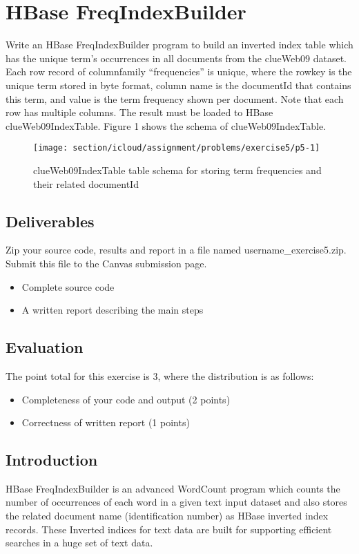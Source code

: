\section*{HBase FreqIndexBuilder}


Write an HBase FreqIndexBuilder program to build an inverted index table which
has the unique term's occurrences in all documents from the clueWeb09 dataset.
Each row record of columnfamily ``frequencies'' is unique, where the rowkey is
the unique term stored in byte format, column name is the documentId that
contains this term, and value is the term frequency shown per document. Note
that each row has multiple columns. The result must be loaded to HBase
clueWeb09IndexTable. Figure 1 shows the schema of clueWeb09IndexTable.

\begin{figure}[!htbp]
\texttt{[image: section/icloud/assignment/problems/exercise5/p5-1]}
\centering
\caption{clueWeb09IndexTable table schema for storing term frequencies and their related documentId}
\end{figure}

\subsection*{Deliverables}
Zip your source code, results and report in a file named
username\_exercise5.zip. Submit this file to the Canvas submission page.

\begin{itemize}
\item Complete source code
\item A written report describing the main steps
\end{itemize}

\subsection*{Evaluation}
The point total for this exercise is 3, where the distribution is as follows:
\begin{itemize}
\item Completeness of your code and output (2 points)
\item Correctness of written report (1 points)
\end{itemize}

\subsection*{Introduction}
HBase FreqIndexBuilder is an advanced WordCount program which counts the number
of occurrences of each word in a given text input dataset and also stores the
related document name (identification number) as HBase inverted index records.
These Inverted indices for text data are built for supporting efficient
searches in a huge set of text data.

